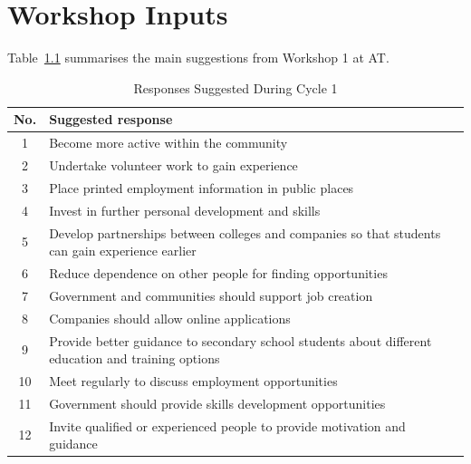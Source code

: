 \chapter{Workshop Inputs}
\label{app:workshop-suggestions}

Table~\ref{tab:cycle1_suggested_responses} summarises the main suggestions from Workshop 1 at AT.

\begin{table}[htbp]
\centering
\caption{Responses Suggested During Cycle 1}
\label{tab:cycle1_suggested_responses}
\small
\renewcommand{\arraystretch}{1.12}
\begin{tabular}{c p{12.5cm}}
\hline
\textbf{No.} & \textbf{Suggested response} \\
\hline
1 & Become more active within the community \\
2 & Undertake volunteer work to gain experience \\
3 & Place printed employment information in public places \\
4 & Invest in further personal development and skills \\
5 & Develop partnerships between colleges and companies so that students can gain experience earlier \\
6 & Reduce dependence on other people for finding opportunities \\
7 & Government and communities should support job creation \\
8 & Companies should allow online applications \\
9 & Provide better guidance to secondary school students about different education and training options \\
10 & Meet regularly to discuss employment opportunities \\
11 & Government should provide skills development opportunities \\
12 & Invite qualified or experienced people to provide motivation and guidance \\
\hline
\end{tabular}
\end{table}